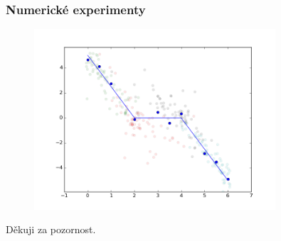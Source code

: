 \documentclass{beamer}
\begin{document}
\begin{frame}
\frametitle{Numerické experimenty}
\begin{figure}
	[H]\centering\includegraphics[width=0.8\textwidth]{images/prezentace2_hists.png}
\end{figure}
\end{frame}

\begin{frame}
Děkuji za pozornost.
\end{frame}
\end{document}
